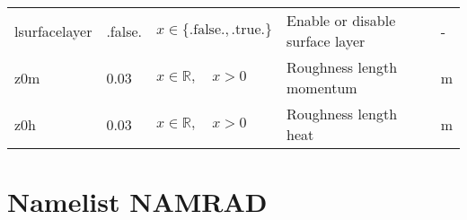 \documentclass[twoside,11pt,fleqn,a4paper,english,openright]{report}
\begin{document}
\begin{center}
  \tablehead{
  }
  \tabletail{
  }
  \tablelasttail{
        &&&&\\\hline
  }
\begin{supertabular}{|l|p{1.6cm}|p{4cm}|p{6.3cm}|l|}
  lsurfacelayer		&	.false.	&	$x\in\{\text{.false.},\text{.true.}\}$	& Enable or disable surface layer	& -\\
  z0m		&	0.03		&	$x \in \mathbb{R}, \quad x > 0$		& Roughness length momentum	&	m\\
  z0h		&	0.03		&	$x \in \mathbb{R}, \quad x > 0$		& Roughness length heat	&	m\\
\end{supertabular}
\end{center}
\section{Namelist NAMRAD}\label{par:namrad}
\end{document}

